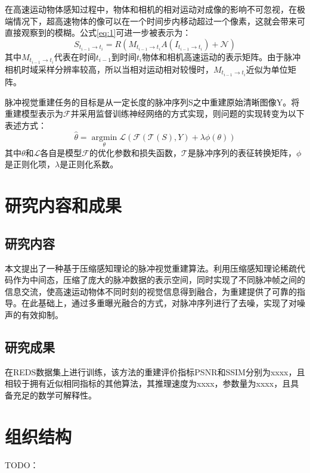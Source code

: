 在高速运动物体感知过程中，物体和相机的相对运动对成像的影响不可忽视，在极端情况下，超高速物体的像可以在一个时间步内移动超过一个像素，这就会带来可直接观察到的模糊。公式\ref{eq:1}可进一步被表示为：
\begin{equation}
  \label{eq:2}
    S_{t_{i-1} \rightarrow t_{i}}=R(M_{t_{i-1} \rightarrow t_{i}}A(I_{t_{i-1} \rightarrow t_{i}})+\mathcal{N})
\end{equation}
其中$M_{t_{i-1} \rightarrow t_{i}}$代表在时间$t_{i-1}$到时间$t_{i}$物体和相机高速运动的表示矩阵。由于脉冲相机时域采样分辨率较高，所以当相对运动相对较慢时，$M_{t_{i-1} \rightarrow t_{i}}$近似为单位矩阵。

脉冲视觉重建任务的目标是从一定长度的脉冲序列S之中重建原始清晰图像Y。将重建模型表示为$\mathcal{F}$并采用监督训练神经网络的方式实现，则问题的实现转变为以下表述方式：
\begin{equation}
  \label{eq:3}
  \hat{\theta} = \mathop{\arg\min}\limits_{\theta} \mathcal{L}(\mathcal{F}(\mathcal{T}(S),Y) + \lambda \phi(\theta))
\end{equation}
其中$\theta$和$\mathcal{L}$各自是模型$\mathcal{F}$的优化参数和损失函数，$\mathcal{T}$是脉冲序列的表征转换矩阵，$\phi$是正则化项，$\lambda$是正则化系数。
\section{研究内容和成果}
\subsection{研究内容}
本文提出了一种基于压缩感知理论的脉冲视觉重建算法。利用压缩感知理论稀疏代码作为中间态，压缩了庞大的脉冲数据的表示空间，同时实现了不同脉冲帧之间的信息交流，使高速运动物体不同时刻的视觉信息得到融合，为重建提供了可靠的指导。在此基础上，通过多重曝光融合的方式，对脉冲序列进行了去噪，实现了对噪声的有效抑制。
\subsection{研究成果}
在REDS数据集上进行训练，该方法的重建评价指标PSNR和SSIM分别为xxxx，且相较于拥有近似相同指标的其他算法，其推理速度为xxxx，参数量为xxxx，且具备充足的数学可解释性。
\section{组织结构}
TODO：



